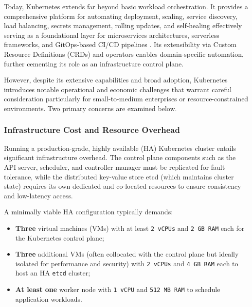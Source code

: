 Today, Kubernetes extends far beyond basic workload orchestration. It provides a comprehensive platform for automating deployment, scaling, service discovery, load balancing, secrets management, rolling updates, and self-healing effectively serving as a foundational layer for microservices architectures, serverless frameworks, and GitOps-based CI/CD pipelines \cite{burns2022kubernetes}. Its extensibility via Custom Resource Definitions (CRDs) and operators enables domain-specific automation, further cementing its role as an infrastructure control plane.

However, despite its extensive capabilities and broad adoption, Kubernetes introduces notable operational and economic challenges that warrant careful consideration particularly for small-to-medium enterprises or resource-constrained environments. Two primary concerns are examined below.

\subsubsection{Infrastructure Cost and Resource Overhead}
Running a production-grade, highly available (HA) Kubernetes cluster entails significant infrastructure overhead. The control plane components such as the API server, scheduler, and controller manager must be replicated for fault tolerance, while the distributed key-value store etcd (which maintains cluster state) requires its own dedicated and co-located resources to ensure consistency and low-latency access.

A minimally viable HA configuration typically demands:
\begin{itemize}
\item \textbf{Three} virtual machines (VMs) with at least \texttt{2 vCPUs} and \texttt{2 GB RAM} each for the Kubernetes control plane;
\item \textbf{Three} additional VMs (often collocated with the control plane but ideally isolated for performance and security) with \texttt{2 vCPUs} and \texttt{4 GB RAM} each to host an HA \texttt{etcd} cluster;
\item \textbf{At least one} worker node with \texttt{1 vCPU} and \texttt{512 MB RAM} to schedule application workloads.
\end{itemize}


